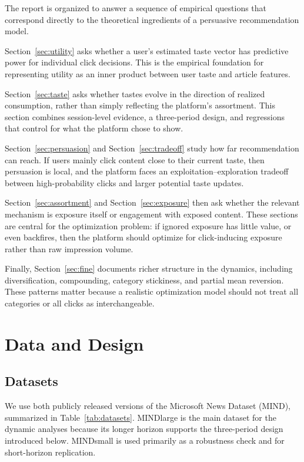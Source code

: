 \documentclass[11pt]{article}
\begin{document}
The report is organized to answer a sequence of empirical questions that correspond directly to the theoretical ingredients of a persuasive recommendation model.

Section~\ref{sec:utility} asks whether a user's estimated taste vector has predictive power for individual click decisions. This is the empirical foundation for representing utility as an inner product between user taste and article features.

Section~\ref{sec:taste} asks whether tastes evolve in the direction of realized consumption, rather than simply reflecting the platform's assortment. This section combines session-level evidence, a three-period design, and regressions that control for what the platform chose to show.

Section~\ref{sec:persuasion} and Section~\ref{sec:tradeoff} study how far recommendation can reach. If users mainly click content close to their current taste, then persuasion is local, and the platform faces an exploitation--exploration tradeoff between high-probability clicks and larger potential taste updates.

Section~\ref{sec:assortment} and Section~\ref{sec:exposure} then ask whether the relevant mechanism is exposure itself or engagement with exposed content. These sections are central for the optimization problem: if ignored exposure has little value, or even backfires, then the platform should optimize for click-inducing exposure rather than raw impression volume.

Finally, Section~\ref{sec:fine} documents richer structure in the dynamics, including diversification, compounding, category stickiness, and partial mean reversion. These patterns matter because a realistic optimization model should not treat all categories or all clicks as interchangeable.

\section{Data and Design}

\subsection{Datasets}

We use both publicly released versions of the Microsoft News Dataset (MIND), summarized in Table~\ref{tab:datasets}. MINDlarge is the main dataset for the dynamic analyses because its longer horizon supports the three-period design introduced below. MINDsmall is used primarily as a robustness check and for short-horizon replication.
\end{document}
